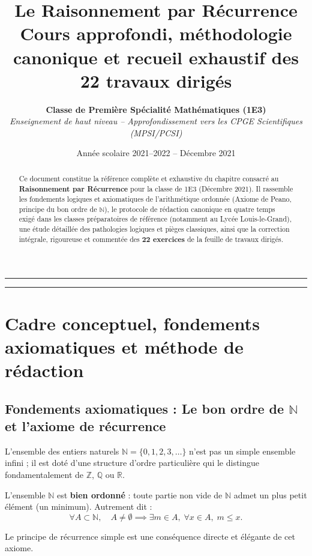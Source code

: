 \documentclass[11pt,a4paper]{article}
\title{\Huge \textbf{Le Raisonnement par Récurrence}\\[0.4cm]
\Large Cours approfondi, méthodologie canonique et recueil exhaustif des 22 travaux dirigés}
\author{\textbf{Classe de Première Spécialité Mathématiques (1E3)}\\
\textit{Enseignement de haut niveau -- Approfondissement vers les CPGE Scientifiques (MPSI/PCSI)}}
\date{Année scolaire 2021--2022 -- Décembre 2021}
\newcommand{\N}{\mathbb{N}}
\newcommand{\Z}{\mathbb{Z}}
\newcommand{\Q}{\mathbb{Q}}
\newcommand{\R}{\mathbb{R}}
\begin{document}
\maketitle

\vspace{-0.5cm}
\begin{abstract}
Ce document constitue la référence complète et exhaustive du chapitre consacré au \textbf{Raisonnement par Récurrence} pour la classe de 1E3 (Décembre 2021). Il rassemble les fondements logiques et axiomatiques de l'arithmétique ordonnée (Axiome de Peano, principe du bon ordre de $\N$), le protocole de rédaction canonique en quatre temps exigé dans les classes préparatoires de référence (notamment au Lycée Louis-le-Grand), une étude détaillée des pathologies logiques et pièges classiques, ainsi que la correction intégrale, rigoureuse et commentée des \textbf{22 exercices} de la feuille de travaux dirigés.
\end{abstract}

\vspace{0.3cm}
\hrule
\vspace{0.3cm}
\tableofcontents
\vspace{0.5cm}
\hrule
\vspace{1cm}
\section{Cadre conceptuel, fondements axiomatiques et méthode de rédaction}

\subsection{Fondements axiomatiques : Le bon ordre de $\N$ et l'axiome de récurrence}

L'ensemble des entiers naturels $\N = \{0, 1, 2, 3, \dots\}$ n'est pas un simple ensemble infini ; il est doté d'une structure d'ordre particulière qui le distingue fondamentalement de $\Z$, $\Q$ ou $\R$.

\begin{theoremebox}
L'ensemble $\N$ est \textbf{bien ordonné} : toute partie non vide de $\N$ admet un plus petit élément (un minimum).
Autrement dit :
\[
\forall A \subset \N, \quad A \neq \emptyset \implies \exists m \in A, \; \forall x \in A, \; m \le x.
\]
\end{theoremebox}

Le principe de récurrence simple est une conséquence directe et élégante de cet axiome.
\end{document}
